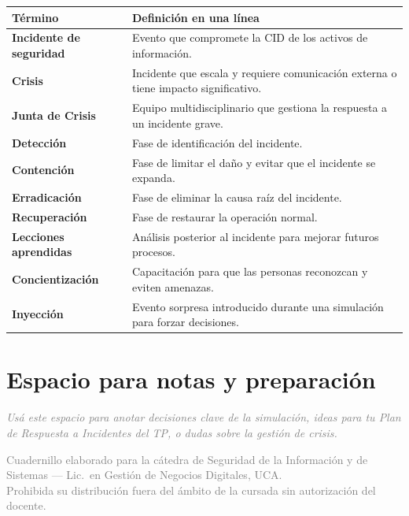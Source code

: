 \documentclass[12pt,a4paper]{article}
\renewcommand{\arraystretch}{1.25}
\begin{document}
\renewcommand{\arraystretch}{1.4}
\begin{tabularx}{\textwidth}{>{\bfseries}p{4.5cm}X}
\toprule
\textbf{T\'ermino} & \textbf{Definici\'on en una l\'inea} \\
\midrule
Incidente de seguridad & Evento que compromete la CID de los activos de informaci\'on. \\
Crisis & Incidente que escala y requiere comunicaci\'on externa o tiene impacto significativo. \\
Junta de Crisis & Equipo multidisciplinario que gestiona la respuesta a un incidente grave. \\
Detecci\'on & Fase de identificaci\'on del incidente. \\
Contenci\'on & Fase de limitar el da\~no y evitar que el incidente se expanda. \\
Erradicaci\'on & Fase de eliminar la causa ra\'iz del incidente. \\
Recuperaci\'on & Fase de restaurar la operaci\'on normal. \\
Lecciones aprendidas & An\'alisis posterior al incidente para mejorar futuros procesos. \\
Concientizaci\'on & Capacitaci\'on para que las personas reconozcan y eviten amenazas. \\
Inyecci\'on & Evento sorpresa introducido durante una simulaci\'on para forzar decisiones. \\
\bottomrule
\end{tabularx}

\vspace{1cm}

\section{Espacio para notas y preparaci\'on}

\begin{tcolorbox}[colback=grisClaro, colframe=gray!50, arc=2mm, height=7cm]
\textcolor{gray}{\itshape Us\'a este espacio para anotar decisiones clave de la simulaci\'on, ideas para tu Plan de Respuesta a Incidentes del TP, o dudas sobre la gesti\'on de crisis.}
\end{tcolorbox}

\vfill
\begin{center}
\small\textcolor{gray}{%
Cuadernillo elaborado para la c\'atedra de Seguridad de la Informaci\'on y de
Sistemas --- Lic.\ en Gesti\'on de Negocios Digitales, UCA.\\
Prohibida su distribuci\'on fuera del \'ambito de la cursada sin autorizaci\'on del docente.}
\end{center}
\end{document}
